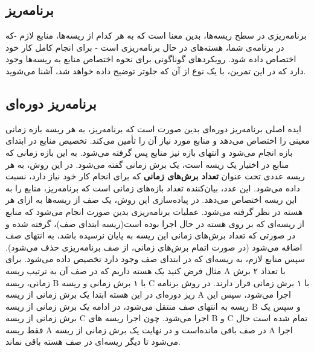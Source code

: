 \documentclass{utap}
\begin{document}
    
    	\subsection{برنامه‌ریز\protect{}} %
    	\hspace{5mm}
    برنامه‌ریزی در سطح ریسه‌‌ها، بدین معنا است که به هر کدام از ریسه‌ها، منابع لازم -که در برنامه‌ی شما، هسته‌های در حال برنامه‌ریزی است - برای انجام کامل کار خود اختصاص داده شود. رویکردهای گوناگونی برای نحوه اختصاص منابع به ریسه‌ها وجود دارد که در این تمرین، با یک نوع از آن که جلوتر توضیح داده خواهد شد، آشنا می‌شوید.
    	\subsection{برنامه‌ریز دوره‌ای} %
    	\hspace{5mm}
    	ایده اصلی برنامه‌ریز دوره‌ای  بدین صورت است که برنامه‌ریز، به هر ریسه بازه زمانی معینی را اختصاص می‌دهد و منابع مورد نیاز آن را تأمین می‌کند. تخصیص منابع در ابتدای بازه انجام می‌شود و انتهای بازه نیز منابع پس گرفته می‌شود. به این بازه زمانی که منابع در اختیار یک ریسه است، یک برش زمانی گفته می‌شود.
    	در این روش، به هر ریسه عددی تحت عنوان \textbf{تعداد برش‌های زمانی} که برای انجام کار خود نیاز دارد، نسبت داده می‌شود. این عدد، بیان‌‌کننده تعداد بازه‌های زمانی است که برنامه‌ریز، منابع را به این ریسه اختصاص می‌دهد.
    	در پیاده‌سازی این روش، یک صف از ریسه‌‌ها به ازای هر هسته در نظر گرفته می‌شود. عملیات برنامه‌ریزی بدین صورت انجام می‌شود که منابع از ریسه‌ای که بر روی هسته در حال اجرا بوده است(ریسه ابتدای صف)، گرفته شده و در صورتی که تعداد برش‌های زمانی این ریسه به پایان نرسیده باشد، به انتهای صف اضافه می‌شود (در صورت اتمام برش‌های زمانی، از صف برنامه‌ریزی حذف می‌شود). سپس منابع لازم، به ریسه‌ای که در ابتدای صف وجود دارد تخصیص داده می‌شود.
    	\newline
    	برای مثال فرض کنید یک هسته داریم که در صف آن به ترتیب ریسه‌ A با تعداد ۲ برش زمانی، ریسه‌ B با ۱ برش زمانی و ریسه C با ۱ برش زمانی قرار دارند. در روش برنامه‌ ریز دوره‌ای در این هسته ابتدا یک برش زمانی از ریسه A اجرا می‌شود، سپس این ریسه به انتها‌ی صف منتقل می‌شود، در ادامه یک برش زمانی از ریسه  ‌B و سپس یک برش زمانی از ریسه C اجرا می‌شود. چون اجرا ریسه های B و C تمام شده است حال فقط ریسه A در صف باقی مانده‌است و در نهایت یک برش زمانی از ریسه A اجرا می‌شود تا دیگر ریسه‌ای در صف هسته باقی‌ نماند.
    	
\end{document}
